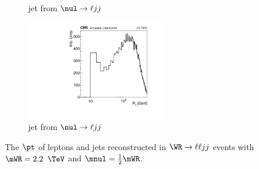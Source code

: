 \begin{figure}
\begin{subfigure}[t]{2.4in}
		\caption{jet from $\nul \rightarrow \ell jj$}\label{fig:wrLeptJetPtsc}
	\end{subfigure}
	\thickspace
	\begin{subfigure}[t]{2.4in}
		\centering
		\includegraphics[width=2.4in]{figures/ptMatchedRecoJetTwo_mwr2200_mnu1100.pdf}
		\caption{jet from $\nul \rightarrow \ell jj$}\label{fig:wrLeptJetPtsd}
	\end{subfigure}
	\caption{The $\pt$ of leptons and jets reconstructed in $\WR \rightarrow \ell\ell jj$ events with $\mWR = 2.2$ $\TeV$ 
		and $\mnul = \frac{1}{2}\mWR$.}\label{fig:wrLeptJetPts}
\end{figure}


